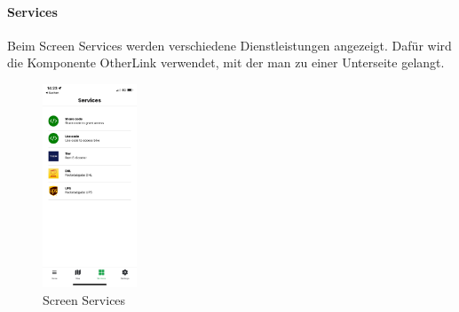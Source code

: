 \paragraph{Services}Beim Screen Services werden verschiedene Dienstleistungen angezeigt. Dafür wird die Komponente OtherLink verwendet, mit der man zu einer Unterseite gelangt.\\
\begin{figure}[H]
    \centering
    \includegraphics[width=0.25\textwidth]{images/app-screenshots/screenservices.png}
    \caption{Screen Services}
    \label{fig:screenservices}
\end{figure}


